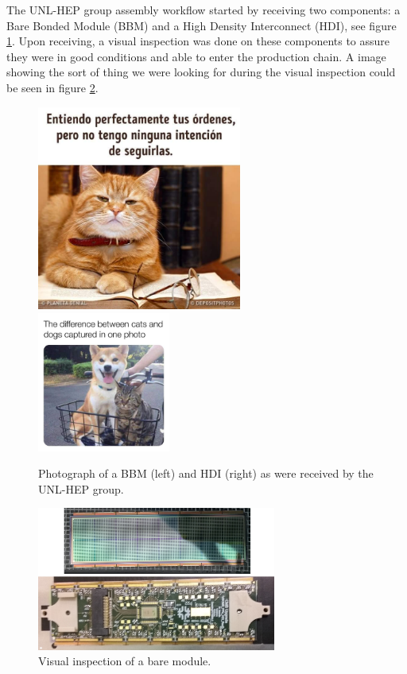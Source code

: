 The UNL-HEP group assembly workflow started by receiving two components: a Bare Bonded Module (BBM) and a High Density Interconnect (HDI), see figure \ref{fig:bbmyhdi}. Upon receiving, a visual inspection was done on these components to assure they were in good conditions and able to enter the production chain. A image showing the sort of thing we were looking for during the visual inspection could be seen in figure \ref{fig:vis_insp}.    
 
\begin{figure}[!h]
\centering
\includegraphics[width=0.6\textwidth]{../images/ch7/gato1}
\includegraphics[width=0.39\textwidth]{../images/ch7/gato2}
\caption[Photograph of a BBM and HDI.]{Photograph of a BBM (left) and HDI (right) as were received by the UNL-HEP group.}\label{fig:bbmyhdi}
\end{figure}

\begin{figure}[!h]
  \centering
  \includegraphics[width=0.7\textwidth]{../images/ch7/bbm_hdi}
  \caption[Visual inspection of a bare module.]{Visual inspection of a bare module.}\label{fig:vis_insp}
\end{figure}



